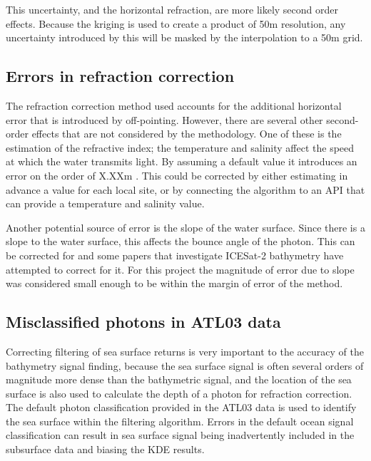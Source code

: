 This uncertainty, and the horizontal refraction, are more likely second order effects. Because the kriging is used to create a product of 50m resolution, any uncertainty introduced by this will be masked by the interpolation to a 50m grid.

\subsection{Errors in refraction correction}

The refraction correction method used accounts for the additional horizontal error that is introduced by off-pointing. However, there are several other second-order effects that are not considered by the methodology. One of these is the estimation of the refractive index; the temperature and salinity affect the speed at which the water transmits light. By assuming a default value it introduces an error on the order of X.XXm . This could be corrected by either estimating in advance a value for each local site, or by connecting the algorithm to an API that can provide a temperature and salinity value. 

Another potential source of error is the slope of the water surface. Since there is a slope to the water surface, this affects the bounce angle of the photon. This can be corrected for and some papers that investigate ICESat-2 bathymetry have attempted to correct for it. For this project the magnitude of error due to slope was considered small enough to be within the margin of error of the method.

\subsection*{Misclassified photons in ATL03 data}

Correcting filtering of sea surface returns is very important to the accuracy of the bathymetry signal finding, because the sea surface signal is often several orders of magnitude more dense than the bathymetric signal, and the location of the sea surface is also used to calculate the depth of a photon for refraction correction. The default photon classification provided in the ATL03 data is used to identify the sea surface within the filtering algorithm. Errors in the default ocean signal classification can result in sea surface signal being inadvertently included in the subsurface data and biasing the KDE results.

